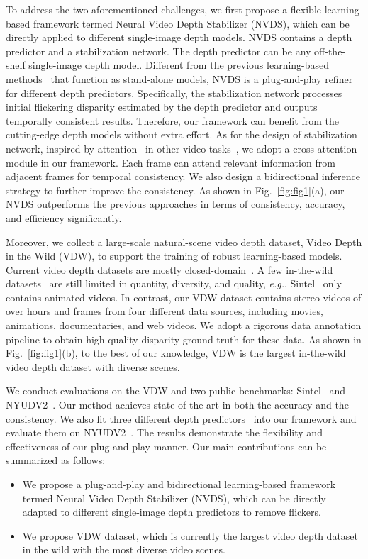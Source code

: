 \documentclass[10pt,twocolumn,letterpaper]{article}
\def\framework{Neural Video Depth Stabilizer}
\def\sx{NVDS}
\def\sbn{stabilization network}
\def\data{VDW}
\def\sota{state-of-the-art}
\def\reffig{Fig.}
\begin{document}
To address the two aforementioned challenges, we first propose a flexible learning-based framework termed \framework{} (\sx{}), which can be directly applied to different single-image depth models. \sx{} contains a depth predictor and a \sbn{}. The depth predictor can be any off-the-shelf single-image depth model. Different from the previous learning-based methods~\cite{MM21,fmnet,ST-CLSTM,deepv2d} that function as stand-alone models, \sx{} is a plug-and-play refiner for different depth predictors. Specifically, the \sbn{} processes initial flickering disparity estimated by the depth predictor and outputs temporally consistent results. 
Therefore, our framework can benefit from the cutting-edge depth models without extra effort. As for the design of \sbn{}, inspired by attention~\cite{transformer} in other video tasks~\cite{stt,ctrans,vivit,cffm}, we adopt a cross-attention module in our framework. Each frame can attend relevant information from adjacent frames for temporal consistency. We also design a bidirectional inference strategy to further improve the consistency. As shown in \reffig{}~\ref{fig:fig1}(a), our \sx{} outperforms the previous approaches in terms of consistency, accuracy, and efficiency significantly.

Moreover, we collect a large-scale natural-scene video depth dataset, Video Depth in the Wild (\data{}), to support the training of robust learning-based models. 
Current video depth datasets are mostly closed-domain~\cite{kitti,tum,nyu,scannet,irs}. A few in-the-wild datasets~\cite{sintel,tata,wsvd} are still limited in quantity, diversity, and quality, \textit{e.g.}, Sintel~\cite{sintel} only contains  animated videos. In contrast, our \data{} dataset contains  stereo videos of over  hours and  frames from four different data sources, including movies, animations, documentaries, and web videos. We adopt a rigorous data annotation pipeline to obtain high-quality disparity ground truth for these data.
As shown in \reffig{}~\ref{fig:fig1}(b), to the best of our knowledge, \data{} is the largest in-the-wild video depth dataset with diverse scenes. 



We conduct evaluations on the \data{} and two public benchmarks: Sintel~\cite{sintel} and NYUDV2~\cite{nyu}. Our method achieves \sota{} in both the accuracy and the consistency.
We also fit three different depth predictors~\cite{dpt,midas,newcrfs} into our framework and evaluate them on NYUDV2~\cite{nyu}. The results demonstrate the flexibility and effectiveness of our plug-and-play manner. 
Our main contributions can be summarized as follows:
\begin{itemize}[leftmargin=*]


    \item We propose a plug-and-play and bidirectional learning-based framework termed \framework{} (\sx{}), which can be directly adapted to different single-image depth predictors to remove flickers.

    \item We propose \data{} dataset, which is currently the largest video depth dataset in the wild with the most diverse video scenes.

\end{itemize}
\end{document}
